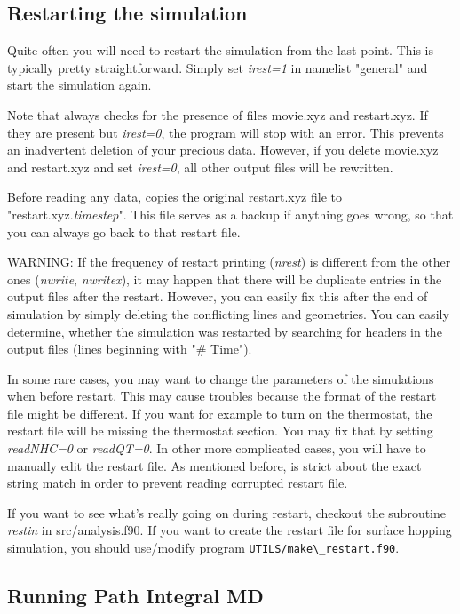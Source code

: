 \subsection{Restarting the simulation}

Quite often you will need to restart the simulation from the last point. This is typically pretty straightforward. Simply set \textit{irest=1} in namelist "general" and start the simulation again. 

Note that \abin always checks for the presence of files movie.xyz and restart.xyz. If they are present but \textit{irest=0}, the program will stop with an error. This prevents an inadvertent deletion of your precious data. However, if you delete movie.xyz and restart.xyz and set \textit{irest=0}, all other output files will be rewritten. 

Before reading any data, \abin copies the original restart.xyz file to "restart.xyz.\textit{timestep}". This file serves as a backup if anything goes wrong, so that you can always go back to that restart file. 

\medskip
WARNING: If the frequency of restart printing (\textit{nrest}) is different from the other ones (\textit{nwrite}, \textit{nwritex}), it may happen that there will be duplicate entries in the output files after the restart. However, you can easily fix this after the end of simulation by simply deleting the conflicting lines and geometries. You can easily determine, whether the simulation was restarted by searching for headers in the output files (lines beginning with "\# Time").

\medskip
In some rare cases, you may want to change the parameters of the simulations when before restart.
This may cause troubles because the format of the restart file might be different. If you want for example to turn on the thermostat, the restart file will be missing the thermostat section. You may fix that by setting \textit{readNHC=0} or \textit{readQT=0}. In other more complicated cases, you will have to manually edit the restart file. As mentioned before, \abin is strict about the exact string match in order to prevent reading corrupted restart file.  

If you want to see what's really going on during restart, checkout the subroutine \textit{restin} in src/analysis.f90. If you want to create the restart file for surface hopping simulation, you should use/modify program \verb|UTILS/make\_restart.f90|.

\subsection{Running Path Integral MD}

